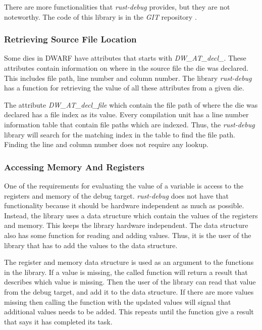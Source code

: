There are more functionalities that \emph{rust-debug} provides, but they are not noteworthy.
The code of this library is in the \emph{GIT} repository \cite{rust-debug}.



\subsubsection{Retrieving Source File Location}
Some \glspl{die} in \gls{DWARF} have attributes that starts with \emph{DW\_AT\_decl\_}.
These attributes contain information on where in the source file the \gls{die} was declared.
This includes file path, line number and column number.
The library \emph{rust-debug} has a function for retrieving the value of all these attributes from a given \gls{die}.


The attribute  \emph{DW\_AT\_decl\_file} which contain the file path of where the \gls{die} was declared has a file index as its value.
Every compilation unit has a line number information table that contain file paths which are indexed.
Thus, the \emph{rust-debug} library will search for the matching index in the table to find the file path.
Finding the line and column number does not require any lookup.


\subsubsection{Accessing Memory And Registers}
One of the requirements for evaluating the value of a variable is access to the registers and memory of the debug target.
\emph{rust-debug} does not have that functionality because it should be hardware independent as much as possible.
Instead, the library uses a data structure which contain the values of the registers and memory.
This keeps the library hardware independent.
The data structure also has some function for reading and adding values.
Thus, it is the user of the library that has to add the values to the data structure.


The register and memory data structure is used as an argument to the functions in the library.
If a value is missing, the called function will return a result that describes which value is missing.
Then the user of the library can read that value from the debug target, and add it to the data structure.
If there are more values missing then calling the function with the updated values will signal that additional values needs to be added.
This repeats until the function give a result that says it has completed its task.


